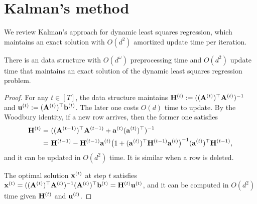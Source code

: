 \section{Kalman's method}
\label{sec:exact}

We review Kalman's approach for dynamic least squares regression, which maintains an exact solution with $O(d^2)$ amortized update time per iteration. 


\begin{theorem}
There is an data structure with $O(d^{\omega})$ preprocessing time and $O(d^2)$ update time that maintains an exact solution of the dynamic least squares regression problem.
\end{theorem}
\begin{proof}
For any $t\in [T]$, the data structure maintains $\mathbf{H}^{(t)} := ((\mathbf{A}^{{(t)}})^\top \mathbf{A}^{{(t)}})^{-1}$ and $ \mathbf{u}^{(t)} := (\mathbf{A}^{{(t)}})^{\top} \mathbf{b}^{(t)}$. The later one costs $O(d)$ time to update. By the Woodbury identity, if a new row arrives, then the former one satisfies
\begin{align*}
    \mathbf{H}^{(t)} =&~ ((\mathbf{A}^{(t-1)})^\top \mathbf{A}^{(t-1)} + \mathbf{a}^{(t)} (\mathbf{a}^{{(t)}})^{\top} )^{-1}\\
    =&~ \mathbf{H}^{(t-1)} - \mathbf{H}^{(t-1)}\mathbf{a}^{(t)} \big(1 + (\mathbf{a}^{(t)})^{\top} \mathbf{H}^{(t-1)}\mathbf{a}^{(t)} \big)^{-1} (\mathbf{a}^{(t)})^{\top} \mathbf{H}^{(t-1)},
\end{align*}
and it can be updated in $O(d^2)$ time. It is similar when a row is deleted.


The optimal solution $\mathbf{x}^{(t)}$ at step $t$ satisfies $\mathbf{x}^{(t)}= ((\mathbf{A}^{(t)})^{\top} \mathbf{A}^{(t)})^{-1} (\mathbf{A}^{(t)})^{\top}\mathbf{b}^{(t)} = \mathbf{H}^{(t)}\mathbf{u}^{(t)}$, and it can be computed in $O(d^2)$ time given $\mathbf{H}^{(t)}$ and $\mathbf{u}^{(t)}$.
\end{proof}